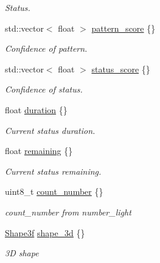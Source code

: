 \begin{DoxyCompactItemize}
\begin{DoxyCompactList}\small\item\em Status. \end{DoxyCompactList}\item 
std\+::vector$<$ float $>$ \hyperlink{structmaf__perception__interface_1_1TrafficLightMultiFrame_ad4a8566fd3321f01139129bfce0d5c3f}{pattern\+\_\+score} \{\}
\begin{DoxyCompactList}\small\item\em Confidence of pattern. \end{DoxyCompactList}\item 
std\+::vector$<$ float $>$ \hyperlink{structmaf__perception__interface_1_1TrafficLightMultiFrame_aec05cf791158e4f91df350f036360734}{status\+\_\+score} \{\}
\begin{DoxyCompactList}\small\item\em Confidence of status. \end{DoxyCompactList}\item 
float \hyperlink{structmaf__perception__interface_1_1TrafficLightMultiFrame_ac6e93b821fbb15988591a612b6cfae0f}{duration} \{\}
\begin{DoxyCompactList}\small\item\em Current status duration. \end{DoxyCompactList}\item 
float \hyperlink{structmaf__perception__interface_1_1TrafficLightMultiFrame_a51bc16f4d5bc4c5cb6372eee02a4349c}{remaining} \{\}
\begin{DoxyCompactList}\small\item\em Current status remaining. \end{DoxyCompactList}\item 
uint8\+\_\+t \hyperlink{structmaf__perception__interface_1_1TrafficLightMultiFrame_aeb469fce4d873e76fd90d43758262ede}{count\+\_\+number} \{\}
\begin{DoxyCompactList}\small\item\em count\+\_\+number from number\+\_\+light \end{DoxyCompactList}\item 
\hyperlink{structmaf__perception__interface_1_1Shape3f}{Shape3f} \hyperlink{structmaf__perception__interface_1_1TrafficLightMultiFrame_a96915e66f54604c632e105d6dee427af}{shape\+\_\+3d} \{\}
\begin{DoxyCompactList}\small\item\em 3D shape \end{DoxyCompactList}\item 

\end{DoxyCompactItemize}
